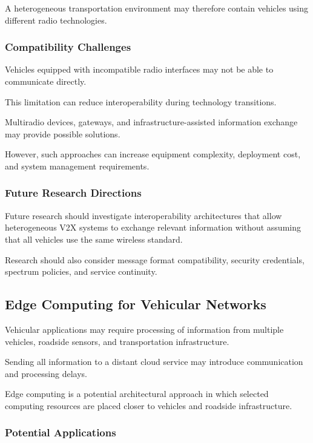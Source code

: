 A heterogeneous transportation
environment may therefore contain
vehicles using different
radio technologies.

\subsubsection{Compatibility Challenges}

Vehicles equipped with incompatible
radio interfaces may not be able
to communicate directly.

This limitation can reduce
interoperability during
technology transitions.

Multiradio devices, gateways,
and infrastructure-assisted
information exchange may
provide possible solutions.

However, such approaches can
increase equipment complexity,
deployment cost, and
system management requirements.

\subsubsection{Future Research Directions}

Future research should investigate
interoperability architectures that
allow heterogeneous V2X systems
to exchange relevant information
without assuming that all vehicles
use the same wireless standard.

Research should also consider
message format compatibility,
security credentials, spectrum
policies, and service continuity.

\subsection{Edge Computing for Vehicular Networks}

Vehicular applications may require
processing of information from
multiple vehicles, roadside sensors,
and transportation infrastructure.

Sending all information to a
distant cloud service may introduce
communication and processing delays.

Edge computing is a potential
architectural approach in which
selected computing resources
are placed closer to vehicles
and roadside infrastructure.

\subsubsection{Potential Applications}

